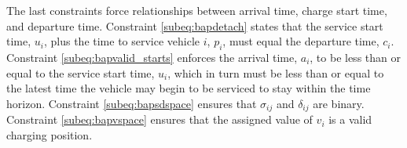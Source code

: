 The last constraints force relationships between arrival time, charge start time, and departure time. Constraint
\autoref{subeq:bapdetach} states that the service start time, $u_i$, plus the time to service vehicle $i$, $p_i$, must
equal the departure time, $c_i$. Constraint \autoref{subeq:bapvalid_starts} enforces the arrival time, $a_i$, to be less
than or equal to the service start time, $u_i$, which in turn must be less than or equal to the latest time the vehicle
may begin to be serviced to stay within the time horizon. Constraint \autoref{subeq:bapsdspace} ensures that $\sigma_{ij}$ and
$\delta_{ij}$ are binary. Constraint \autoref{subeq:bapvspace} ensures that the assigned value of $v_i$ is a valid charging
position.
